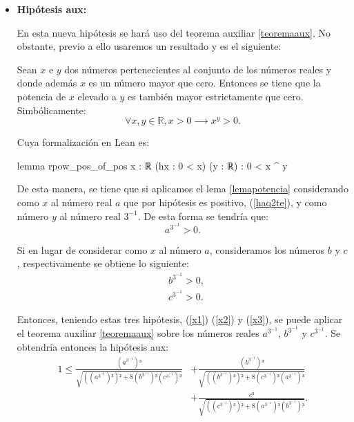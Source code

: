 \begin{demostracion}
\begin{itemize}
  \item \textbf{Hipótesis aux:}

    En esta nueva hipótesis se hará uso del teorema auxiliar
    \ref{teoremaaux}. No obstante, previo a ello usaremos un resultado
    y es el siguiente:
    \begin{lema}\label{lemapotencia}
      Sean \(x\) e \(y\) dos números pertenecientes al conjunto de los
      números reales y donde además \(x\) es un número mayor que cero.
      Entonces se tiene que la potencia de \(x\) elevado a \(y\) es también
      mayor estrictamente que cero. Simbólicamente:
      \begin{equation}
        ∀x,y∈ ℝ, x>0 ⟶ x^{y}>0.
      \end{equation}
    \end{lema}
    Cuya formalización en Lean es:

    \begin{leancode}
    lemma rpow_pos_of_pos {x : ℝ} (hx : 0 < x) (y : ℝ) : 0 < x ^ y 
    \end{leancode}

    De esta manera, se tiene que si aplicamos el lema \ref{lemapotencia}
    considerando como \(x\) al número real \(a\) que por hipótesis es
    positivo, (\ref{haq2te}), y como número \(y\) al número real
    \(3^{-1} \). De esta forma se tendría que:
    \begin{equation}\label{x1}
      a^{3^{-1}}>0.
    \end{equation}

    Si en lugar de considerar como \(x\) al número \(a\), consideramos los
    números \(b\) y \(c\), respectivamente se obtiene lo siguiente:
    \begin{align}
      &b^{3^{-1}}>0,\label{x2}\\
      &c^{3^{-1}}>0.\label{x3}
    \end{align}

    Entonces, teniendo estas tres hipótesis, (\ref{x1}) (\ref{x2}) y
    (\ref{x3}), se puede aplicar el teorema auxiliar \ref{teoremaaux}
    sobre los números reales \(a^{3^{-1}}\), \(b^{3^{-1}}\) y \(c^{3^{-1}}\).
    Se obtendría entonces la hipótesis aux:
    \begin{align*}\label{auxfinal}\tag{aux}
      1≤\frac{(a^{3^{-1}})³}{\sqrt{((a^{3^{-1}})³)²+8(b^{3^{-1}})³(c^{3^{-1}})³}}
      &+\frac{(b^{3^{-1}})³}{\sqrt{((b^{3^{-1}})³)²+8(c^{3^{-1}})³(a^{3^{-1}})³}}\\
        &+\frac{c³}{\sqrt{((c^{3^{-1}})³)²+8(a^{3^{-1}})³(b^{3^{-1}})³}}.
    \end{align*}
  \end{itemize}


\end{demostracion}
